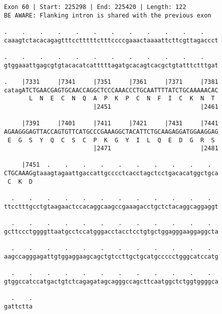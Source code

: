\documentclass{article}
\begin{document}
\begin{Verbatim}
Exon 60 | Start: 225298 | End: 225420 | Length: 122
BE AWARE: Flanking intron is shared with the previous exon
 
.    .    .    .    .    .    .    .    .    .    .    .    
caaagtctacacagagtttcctttttctttccccgaaactaaaattcttcgttagaccct
  
.    .    .    .    .    .    .    .    .    .    .    .    
gtggaaattgagcgtgtacacatcatttttagatgcacagtcacgctgtatttctttgat
  
.    |7331     |7341     |7351     |7361     |7371     |7381
catagATCTGAACGAGTGCAACCAGGCTCCCAAACCCTGCAATTTTATCTGCAAAAACAC
       L  N  E  C  N  Q  A  P  K  P  C  N  F  I  C  K  N  T 
                         |2451                         |2461
  
     |7391     |7401     |7411     |7421     |7431     |7441
AGAAGGGAGTTACCAGTGTTCATGCCCGAAAGGCTACATTCTGCAAGAGGATGGAAGGAG
 E  G  S  Y  Q  C  S  C  P  K  G  Y  I  L  Q  E  D  G  R  S 
                         |2471                         |2481
  
     |7451  .    .    .    .    .    .    .    .    .    .  
CTGCAAAGgtaaagtagaattgaccattgcccctcacctagctcctgacacatggctgca
 C  K  D                                                    
  
  .    .    .    .    .    .    .    .    .    .    .    .  
ttcctttgcctgtaagaactccacaggcaagccgaaagacctgctctacaggcaggaggt
  
  .    .    .    .    .    .    .    .    .    .    .    .  
gcttccctggggttaatgcctccatgggacctacctcctgtgctggagggaaggaggcta
  
  .    .    .    .    .    .    .    .    .    .    .    .  
aagccagggagattgtggaggaagcagctgtccttgctgcatgccccctgggcatccatg
  
  .    .    .    .    .    .    .    .    .    .    .    .  
gtggccatccatgactgtctcagagatagcagggccagcttcaatggctctggtggggca
  
  .    .
gattctta
\end{Verbatim}
\newpage
\end{document}
